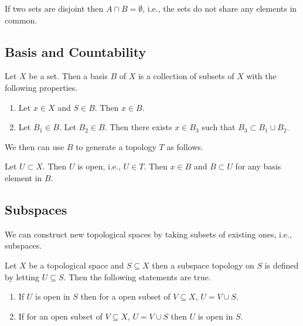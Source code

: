 \documentclass{article}
\newtheorem{theorem}{Theorem}[section]
\newtheorem{proposition}[theorem]{Proposition}
\newtheorem{example}[theorem]{Example}
\begin{document}
If two sets are disjoint then $ A \cap B = \emptyset $, i.e., the sets do not share any elements in common.
\subsection{Basis and Countability}

Let $ X $ be a set. Then a basis $ B $ of $ X $ is a collection of subsets of $ X $ with the following
properties.

\begin{enumerate}
\item Let $ x \in X $ and $ S \in B $. Then $ x \in B $.
\item Let $ B_{1} \in B $. Let $ B_{2} \in B $. Then there exists  $ x \in B_{3} $ such that $ B_{3} \subset B_{1} \cup B_{2} $.
\end{enumerate}

We then can use $ B $ to generate a topology $ T $ as follows.

Let $ U \subset X $. Then $ U $ is open, i.e., $ U \in T $. Then  $ x \in B $ and $ B \subset U $ for any basis element in $ B $.

\subsection{Subspaces}

We can construct new topological spaces by taking subsets of existing ones, i.e., subspaces.

Let $ X $ be a topological space and $ S \subseteq X $ then a subspace topology on $ S $ is defined
by letting  $ U \subseteq  S $. Then the following statements are true.

\begin{enumerate}
\item If $ U $ is open in $ S $ then for a open subset of $ V \subseteq X $, $ U =  V \cup  S $.
\item If for an open subset of $ V \subseteq X $, $ U =  V \cup  S $ then  $ U $ is open in $ S $.
\end{enumerate}










\end{document}
